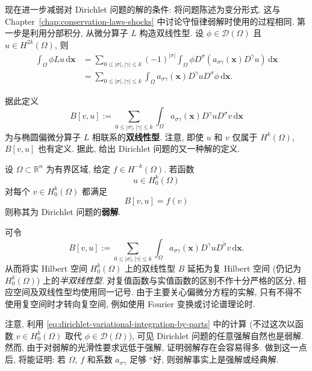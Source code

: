 现在进一步减弱对 Dirichlet 问题的解的条件: 将问题陈述为变分形式. 这与 Chapter~\ref{chap:conservation-laws-shocks} 中讨论守恒律弱解时使用的过程相同. 第一步是利用分部积分, 从微分算子 $L$ 构造双线性型. 设 $\phi\in\mathcal{D}(\Omega)$ 且 $u\in H^{2k}(\Omega)$, 则
\begin{equation}\label{eq:dirichlet-variational-integration-by-parts}
\begin{aligned}
\int_\Omega\phi Lu\,\mathrm{d}\bm{x}
&=\sum_{0\leq|\sigma|,|\gamma|\leq k}(-1)^{|\sigma|}\int_\Omega\phi D^\sigma(a_{\sigma\gamma}(\bm{x})D^\gamma u)\,\mathrm{d}\bm{x}\\
&=\sum_{0\leq|\sigma|,|\gamma|\leq k}\int_\Omega a_{\sigma\gamma}(\bm{x})D^\gamma uD^\sigma\phi\,\mathrm{d}\bm{x}.
\end{aligned}
\end{equation}


据此定义
\begin{equation}\label{eq:elliptic-dirichlet-bilinear-form-definition}
B[v,u]:=\sum_{0\leq|\sigma|,|\gamma|\leq k}\int_\Omega a_{\sigma\gamma}(\bm{x})D^\gamma uD^\sigma v\,\mathrm{d}\bm{x}
\end{equation}
为与椭圆偏微分算子 $L$ 相联系的\textbf{双线性型}. 注意, 即使 $u$ 和 $v$ 仅属于 $H^k(\Omega)$, $B[v,u]$ 也有定义. 据此, 给出 Dirichlet 问题的又一种解的定义.

\begin{Definition}
\label{def:weak-dirichlet-solution}
设 $\Omega\subset\mathbb{R}^n$ 为有界区域, 给定 $f\in H^{-k}(\Omega)$. 若函数\[u\in H_0^k(\Omega)\]对每个 $v\in H_0^k(\Omega)$ 都满足
\begin{equation}\label{eq:weak-dirichlet-variational-equation}
B[v,u]=f(v)
\end{equation}
则称其为 Dirichlet 问题的\textbf{弱解}.
\end{Definition}

\begin{Remark}
\label{rem:complex-dirichlet-sesquilinear-extension}
可令
\begin{equation}\label{eq:complex-elliptic-dirichlet-sesquilinear-form}
B[v,u]:=\sum_{0\leq|\sigma|,|\gamma|\leq k}\int_\Omega a_{\sigma\gamma}(\bm{x})D^\gamma u\overline{D^\sigma v}\,\mathrm{d}\bm{x}.
\end{equation}
从而将实 Hilbert 空间 $H_0^k(\Omega)$ 上的双线性型 $B$ 延拓为复 Hilbert 空间 (仍记为 $H_0^k(\Omega)$) 上的\emph{半双线性型}. 对复值函数与实值函数的区别不作十分严格的区分, 相应空间及双线性型均使用同一记号. 由于主要关心偏微分方程的实解, 只有不得不使用复空间时才转向复空间, 例如使用 Fourier 变换或讨论谱理论时.
\end{Remark}

注意, 利用 \eqref{eq:dirichlet-variational-integration-by-parts} 中的计算 (不过这次以函数 $v\in H_0^k(\Omega)$ 取代 $\phi\in\mathcal{D}(\Omega)$), 可见 Dirichlet 问题的任意强解自然也是弱解. 然而, 由于对弱解的光滑性要求远低于强解, 证明弱解存在会容易得多. 做到这一点后, 将能证明: 若 $\Omega$, $f$ 和系数 $a_{\sigma\gamma}$ 足够 ``好\textquotesingle\textquotesingle, 则弱解事实上是强解或经典解.
